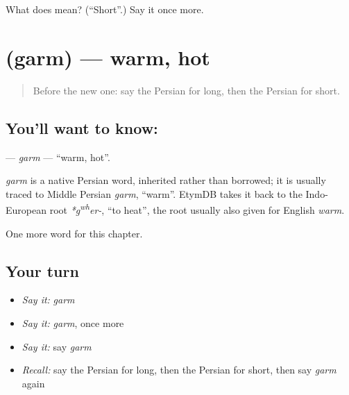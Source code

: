 \begin{tcolorbox}[breakable,colback=teal!4,colframe=teal!35!black,title={Before you move on}]
What does  mean? (\textquotedblleft{}Short\textquotedblright{}.) Say it once more.
\end{tcolorbox}
\section[\texorpdfstring{\fa{گرم} (garm)}{گرم (garm)}]{ (garm) — warm, hot}

\label{lesson:FA-C59-garm}



\begin{quote}
Before the new one: say the Persian for long, then the Persian for short.
\end{quote}

\subsection*{You'll want to know: }
\textbf{} — \emph{garm} — \textquotedblleft{}warm, hot\textquotedblright{}.

\begin{cousinweb}
\emph{garm} is a native Persian word, inherited rather than borrowed; it is usually traced to Middle Persian \emph{garm}, \textquotedblleft{}warm\textquotedblright{}. EtymDB takes it back to the Indo-European root \emph{*g\textsuperscript{w}\textsuperscript{h}er-}, \textquotedblleft{}to heat\textquotedblright{}, the root usually also given for English \emph{warm}.
\end{cousinweb}

\begin{grammarlens}[title={What you've built}]
One more word for this chapter.
\end{grammarlens}

\subsection*{Your turn}
\begin{itemize}
\raggedright
  \item \emph{Say it:} \emph{garm}
  \item \emph{Say it:} \emph{garm}, once more
  \item \emph{Say it:} say \emph{garm}
  \item \emph{Recall:} say the Persian for long, then the Persian for short, then say \emph{garm} again
\end{itemize}

